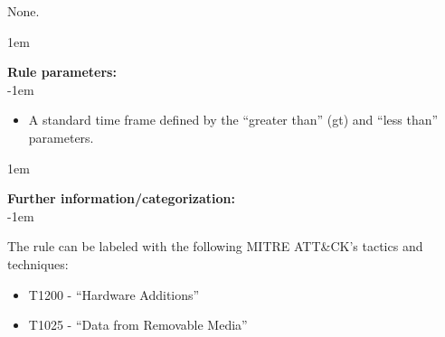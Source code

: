 None.

\openup 1em

{\bf Rule parameters:} \\

\openup -1em
\vspace{-2em}

\begin{itemize}
	\item A standard time frame defined by the ``greater than'' (gt) and ``less than'' parameters.
\end{itemize}

\openup 1em

{\bf Further information/categorization:} \\

\openup -1em
\vspace{-2em}


The rule can be labeled with the following MITRE ATT\&CK's tactics and techniques:
\begin{itemize}
	\item T1200 - ``Hardware Additions''
	\item T1025 - ``Data from Removable Media''
\end{itemize}

\pagebreak

